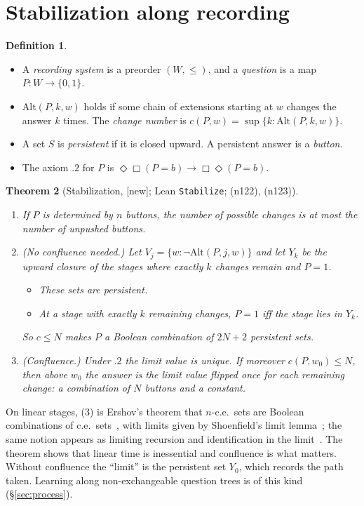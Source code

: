 \documentclass[11pt]{article}
\newtheorem{theorem}{Theorem}[section]
\theoremstyle{definition}
\newtheorem{definition}[theorem]{Definition}
\theoremstyle{remark}
\newcommand{\Alt}{\mathrm{Alt}}
\newcommand{\lean}[1]{\texttt{#1}}
\newcommand{\status}[1]{\textsf{[#1]}}
\newcommand{\note}[1]{\textsf{(n#1)}}
\begin{document}
\section{Stabilization along recording}\label{sec:stab}

\begin{definition}
\leavevmode
\begin{itemize}
\item A \emph{recording system} is a preorder $(W,\le)$, and a \emph{question} is a map $P:W\to\{0,1\}$.
\item $\Alt(P,k,w)$ holds if some chain of extensions starting at $w$ changes the answer $k$ times. The \emph{change number} is $c(P,w)=\sup\{k:\Alt(P,k,w)\}$.
\item A set $S$ is \emph{persistent} if it is closed upward. A persistent answer is a \emph{button}.
\item The axiom $.2$ for $P$ is $\Diamond\Box(P=b)\to\Box\Diamond(P=b)$.
\end{itemize}
\end{definition}

\begin{theorem}[Stabilization, \status{new}; Lean \lean{Stabilize}; \note{122}, \note{123}]\label{thm:stab}
\leavevmode
\begin{enumerate}
\item If $P$ is determined by $n$ buttons, the number of possible changes is at most the number of unpushed buttons.
\item \emph{(No confluence needed.)} Let $V_j=\{w:\neg\Alt(P,j,w)\}$ and let $Y_k$ be the upward closure of the stages where exactly $k$ changes remain and $P=1$.
  \begin{itemize}
  \item These sets are persistent.
  \item At a stage with exactly $k$ remaining changes, $P=1$ iff the stage lies in $Y_k$.
  \end{itemize}
  So $c\le N$ makes $P$ a Boolean combination of $2N+2$ persistent sets.
\item \emph{(Confluence.)} Under $.2$ the limit value is unique. If moreover $c(P,w_0)\le N$, then above $w_0$ the answer is the limit value flipped once for each remaining change: a combination of $N$ buttons and a constant.
\end{enumerate}
\end{theorem}

\noindent On linear stages, (3) is Ershov's theorem that $n$-c.e.\ sets are Boolean combinations of c.e.\ sets~\cite{Ershov68,Ershov70}, with limits given by Shoenfield's limit lemma~\cite{Shoenfield59}; the same notion appears as limiting recursion and identification in the limit~\cite{Gold65,Putnam65,Gold67}. The theorem shows that linear time is inessential and confluence is what matters. Without confluence the ``limit'' is the persistent set $Y_0$, which records the path taken. Learning along non-exchangeable question trees is of this kind (\S\ref{sec:process}).
\end{document}
